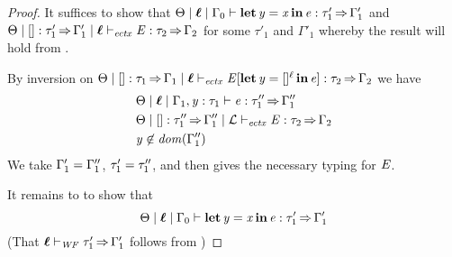 \begin{proof}
  It suffices to show that $ \Theta   \mid   \oldvec{\ell}   \mid   \Gamma_{{\mathrm{0}}}   \vdash    \LET  \mathit{y}  =  \mathit{x}  \IN  \ottnt{e}   :  \tau'_{{\mathrm{1}}}   \produces   \Gamma'_{{\mathrm{1}}} $
  and $\Theta  \mid  \HOLE  \ottsym{:}  \tau'_{{\mathrm{1}}}  \produces  \Gamma'_{{\mathrm{1}}}  \mid  \oldvec{\ell}  \vdash_{\mathit{ectx} }  \ottnt{E}  \ottsym{:}  \tau_{{\mathrm{2}}}  \produces  \Gamma_{{\mathrm{2}}}$ for some $\tau'_{{\mathrm{1}}}$ and $\Gamma'_{{\mathrm{1}}}$
  whereby the result will hold from .

  By inversion on
  $\Theta  \mid  \HOLE  \ottsym{:}  \tau_{{\mathrm{1}}}  \produces  \Gamma_{{\mathrm{1}}}  \mid  \oldvec{\ell}  \vdash_{\mathit{ectx} }   \ottnt{E} [\LET  \mathit{y}  =   \HOLE^ \ell   \IN  \ottnt{e}  ]   \ottsym{:}  \tau_{{\mathrm{2}}}  \produces  \Gamma_{{\mathrm{2}}}$ we have
  \begin{align}
    &  \Theta   \mid   \oldvec{\ell}   \mid   \Gamma_{{\mathrm{1}}}  \ottsym{,}  \mathit{y}  \ottsym{:}  \tau_{{\mathrm{1}}}   \vdash   \ottnt{e}  :  \tau''_{{\mathrm{1}}}   \produces   \Gamma''_{{\mathrm{1}}}  \label{eqn:let-body-ty} \\
    & \Theta  \mid  \HOLE  \ottsym{:}  \tau''_{{\mathrm{1}}}  \produces  \Gamma''_{{\mathrm{1}}}  \mid  \mathcal{L}  \vdash_{\mathit{ectx} }  \ottnt{E}  \ottsym{:}  \tau_{{\mathrm{2}}}  \produces  \Gamma_{{\mathrm{2}}} \label{eqn:ctxt-typed} \\
    &  \mathit{y}  \not\in   \DOM( \Gamma''_{{\mathrm{1}}} )   \label{eqn:y-not-free-var}
  \end{align}
  We take $\Gamma'_{{\mathrm{1}}}  =  \Gamma''_{{\mathrm{1}}}$, $\tau'_{{\mathrm{1}}}  =  \tau''_{{\mathrm{1}}}$, and then 
  gives the necessary typing for $\mathit{E}$.

  It remains to to show that
  \[
     \Theta   \mid   \oldvec{\ell}   \mid   \Gamma_{{\mathrm{0}}}   \vdash    \LET  \mathit{y}  =  \mathit{x}  \IN  \ottnt{e}   :  \tau'_{{\mathrm{1}}}   \produces   \Gamma'_{{\mathrm{1}}} 
  \]
  (That $ \oldvec{\ell}   \vdash _{\wf}  \tau'_{{\mathrm{1}}}   \produces   \Gamma'_{{\mathrm{1}}} $ follows from )
  

\end{proof}
